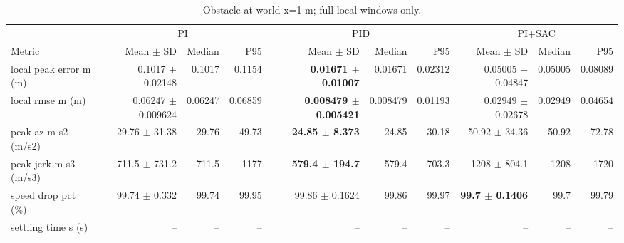 \begin{table}[t]
\centering
\scriptsize
\caption{Obstacle at world x=1 m; full local windows only.}
\label{tab:obstacle-2}
\begin{tabular}{p{}*{9}{r}}
\toprule
 & \multicolumn{3}{c}{PI} & \multicolumn{3}{c}{PID} & \multicolumn{3}{c}{PI+SAC} \\
\cmidrule(lr){2-4}\cmidrule(lr){5-7}\cmidrule(lr){8-10}
Metric & Mean $\pm$ SD & Median & P95 & Mean $\pm$ SD & Median & P95 & Mean $\pm$ SD & Median & P95 \\
\midrule
local peak error m (m) & 0.1017 $\pm$ 0.02148 & 0.1017 & 0.1154 & \textbf{0.01671 $\pm$ 0.01007} & 0.01671 & 0.02312 & 0.05005 $\pm$ 0.04847 & 0.05005 & 0.08089 \\
local rmse m (m) & 0.06247 $\pm$ 0.009624 & 0.06247 & 0.06859 & \textbf{0.008479 $\pm$ 0.005421} & 0.008479 & 0.01193 & 0.02949 $\pm$ 0.02678 & 0.02949 & 0.04654 \\
peak az m s2 (m/s2) & 29.76 $\pm$ 31.38 & 29.76 & 49.73 & \textbf{24.85 $\pm$ 8.373} & 24.85 & 30.18 & 50.92 $\pm$ 34.36 & 50.92 & 72.78 \\
peak jerk m s3 (m/s3) & 711.5 $\pm$ 731.2 & 711.5 & 1177 & \textbf{579.4 $\pm$ 194.7} & 579.4 & 703.3 & 1208 $\pm$ 804.1 & 1208 & 1720 \\
speed drop pct (\%) & 99.74 $\pm$ 0.332 & 99.74 & 99.95 & 99.86 $\pm$ 0.1624 & 99.86 & 99.97 & \textbf{99.7 $\pm$ 0.1406} & 99.7 & 99.79 \\
settling time s (s) & -- & -- & -- & -- & -- & -- & -- & -- & -- \\
\bottomrule
\end{tabular}
\end{table}

